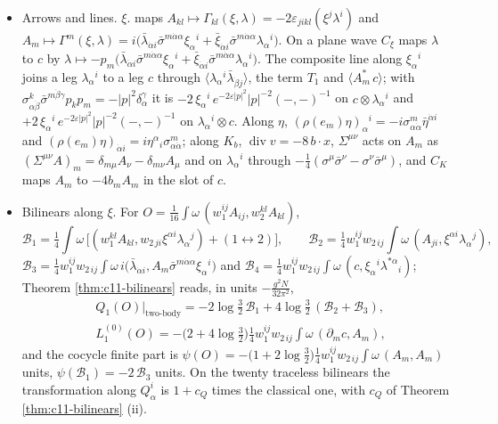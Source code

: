 \begin{remark}
\begin{itemize}
\item Arrows and lines. $\xi.$ maps $A_{kl}\mapsto\Gamma_{kl}(\xi,\lambda)=-2\varepsilon_{jikl}(\xi^j\lambda^i)$ and $A_m\mapsto\Gamma^m(\xi,\lambda)=i\big(\bar\lambda_{\dot\alpha i}\bar\sigma^{m\dot\alpha\alpha}\xi_\alpha{}^i+\bar\xi_{\dot\alpha i}\bar\sigma^{m\dot\alpha\alpha}\lambda_\alpha{}^i\big)$. On a plane wave $C_\xi$ maps $\lambda$ to $c$ by $\lambda\mapsto-p_m\big(\bar\lambda_{\dot\alpha i}\bar\sigma^{m\dot\alpha\alpha}\xi_\alpha{}^i+\bar\xi_{\dot\alpha i}\bar\sigma^{m\dot\alpha\alpha}\lambda_\alpha{}^i\big)$. The composite line along $\xi_\alpha{}^i$ joins a leg $\lambda_\alpha{}^i$ to a leg $c$ through $\langle\lambda_\alpha{}^i\bar\lambda_{\dot\beta j}\rangle$, the term $T_1$ and $\langle A^*_m\,c\rangle$; with $\sigma^k_{\alpha\dot\beta}\bar\sigma^{m\dot\beta\gamma}p_kp_m=-|p|^2\delta_\alpha^\gamma$ it is $-2\,\xi_\alpha{}^i\,e^{-2\varepsilon|p|^2}|p|^{-2}(-,-)^{-1}$ on $c\otimes\lambda_\alpha{}^i$ and $+2\,\xi_\alpha{}^i\,e^{-2\varepsilon|p|^2}|p|^{-2}(-,-)^{-1}$ on $\lambda_\alpha{}^i\otimes c$. Along $\eta$, $(\rho(e_m)\eta)_\alpha{}^i=-i\sigma^m_{\alpha\dot\alpha}\bar\eta^{\dot\alpha i}$ and $(\rho(e_m)\eta)_{\dot\alpha i}=i\eta^\alpha{}_i\sigma^m_{\alpha\dot\alpha}$; along $K_b$, $\operatorname{div}v=-8\,b\cdot x$, $\Sigma^{\mu\nu}$ acts on $A_m$ as $(\Sigma^{\mu\nu}A)_m=\delta_{m\mu}A_\nu-\delta_{m\nu}A_\mu$ and on $\lambda_\alpha{}^i$ through $-\tfrac14(\sigma^\mu\bar\sigma^\nu-\sigma^\nu\bar\sigma^\mu)$, and $C_K$ maps $A_m$ to $-4b_mA_m$ in the slot of $c$.
\item Bilinears along $\xi$. For $O=\tfrac1{16}\int\omega\,(w_1^{ij}A_{ij},w_2^{kl}A_{kl})$,
\[
\mathcal B_1=\tfrac14\int\omega\,\big[(w_1^{kl}A_{kl},w_{2\,ji}\xi^{\alpha i}\lambda_\alpha{}^j)+(1\leftrightarrow2)\big],\qquad \mathcal B_2=\tfrac14w_1^{ij}w_{2\,ij}\int\omega\,(A_{ji},\xi^{\alpha i}\lambda_\alpha{}^j),
\]
$\mathcal B_3=\tfrac14w_1^{ij}w_{2\,ij}\int\omega\,i\big(\bar\lambda_{\dot\alpha i},A_m\bar\sigma^{m\dot\alpha\alpha}\xi_\alpha{}^i\big)$ and $\mathcal B_4=\tfrac14w_1^{ij}w_{2\,ij}\int\omega\,(c,\xi_\alpha{}^i\lambda^{*\alpha}{}_i)$; Theorem \ref{thm:c11-bilinears} reads, in units $-\frac{g^2N}{32\pi^2}$,
\[
\begin{aligned}
&Q_1(O)\big|_{\text{two-body}}=-2\log\tfrac32\,\mathcal B_1+4\log\tfrac32\,(\mathcal B_2+\mathcal B_3),\\
&L_1^{(0)}(O)=-\big(2+4\log\tfrac32\big)\tfrac14w_1^{ij}w_{2\,ij}\int\omega\,(\partial_mc,A_m),
\end{aligned}
\]
and the cocycle finite part is $\psi(O)=-\big(1+2\log\tfrac32\big)\tfrac14w_1^{ij}w_{2\,ij}\int\omega\,(A_m,A_m)$ units, $\psi(\mathcal B_1)=-2\,\mathcal B_3$ units. On the twenty traceless bilinears the transformation along $Q^i_\alpha$ is $1+c_Q$ times the classical one, with $c_Q$ of Theorem \ref{thm:c11-bilinears} (ii).

\end{itemize}
\end{remark}
